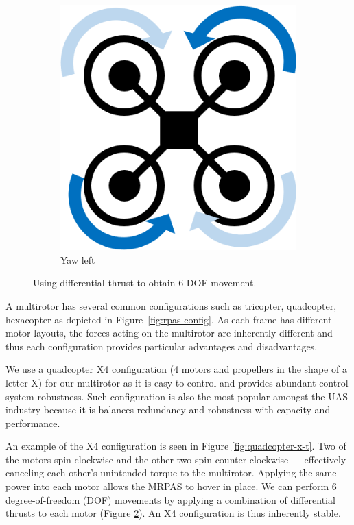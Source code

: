 \begin{figure}[h]
	~
	\begin{subfigure}[b]{0.3\textwidth}
		\centering
		\includegraphics[scale=0.4]{img/drone_x_yaw}
		\caption{Yaw left}
		\label{fig:x-yaw}
	\end{subfigure}
	
	\caption{Using differential thrust to obtain 6-DOF movement. }
	\label{fig:rpas_6dof}
\end{figure}

A multirotor has several common configurations such as tricopter, quadcopter, hexacopter as depicted in Figure~\ref{fig:rpas-config}. As each frame has different motor layouts, the forces acting on the multirotor are inherently different and thus each configuration provides particular advantages and disadvantages.

We use a quadcopter X4 configuration (4 motors and propellers in the shape of a letter X) for our multirotor as it is easy to control and provides abundant control system robustness. Such configuration is also the most popular amongst the UAS industry because it is balances redundancy and robustness with capacity and performance.

An example of the X4 configuration is seen in Figure \ref{fig:quadcopter-x-t}. Two of the motors spin clockwise and the other two spin counter-clockwise --- effectively canceling each other's unintended torque to the multirotor. Applying the same power into each motor allows the MRPAS to hover in place. We can perform 6 degree-of-freedom (DOF) movements by applying a combination of differential thrusts to each motor (Figure \ref{fig:rpas_6dof}). An X4 configuration is thus inherently stable.

